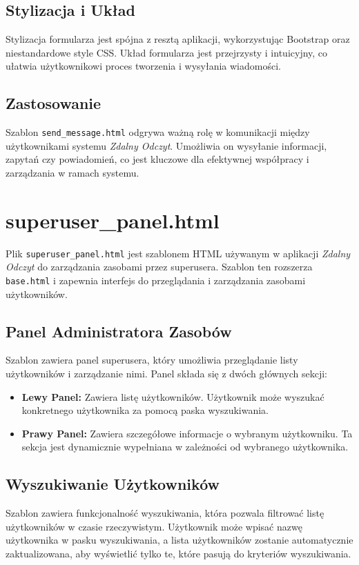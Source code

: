 \documentclass[12pt,a4paper]{report}
\begin{document}
\subsection{Stylizacja i Układ}
Stylizacja formularza jest spójna z resztą aplikacji, wykorzystując Bootstrap oraz niestandardowe style CSS. Układ formularza jest przejrzysty i intuicyjny, co ułatwia użytkownikowi proces tworzenia i wysyłania wiadomości.

\subsection{Zastosowanie}
Szablon \texttt{send\_message.html} odgrywa ważną rolę w komunikacji między użytkownikami systemu \textit{Zdalny Odczyt}. Umożliwia on wysyłanie informacji, zapytań czy powiadomień, co jest kluczowe dla efektywnej współpracy i zarządzania w ramach systemu.


\section{superuser\_panel.html}
\label{sec:superuserpanel}
Plik \texttt{superuser\_panel.html} jest szablonem HTML używanym w aplikacji \textit{Zdalny Odczyt} do zarządzania zasobami przez superusera. Szablon ten rozszerza \texttt{base.html} i zapewnia interfejs do przeglądania i zarządzania zasobami użytkowników.

\subsection{Panel Administratora Zasobów}
Szablon zawiera panel superusera, który umożliwia przeglądanie listy użytkowników i zarządzanie nimi. Panel składa się z dwóch głównych sekcji:
\begin{itemize}
\item \textbf{Lewy Panel:} Zawiera listę użytkowników. Użytkownik może wyszukać konkretnego użytkownika za pomocą paska wyszukiwania.
\item \textbf{Prawy Panel:} Zawiera szczegółowe informacje o wybranym użytkowniku. Ta sekcja jest dynamicznie wypełniana w zależności od wybranego użytkownika.
\end{itemize}

\subsection{Wyszukiwanie Użytkowników}
Szablon zawiera funkcjonalność wyszukiwania, która pozwala filtrować listę użytkowników w czasie rzeczywistym. Użytkownik może wpisać nazwę użytkownika w pasku wyszukiwania, a lista użytkowników zostanie automatycznie zaktualizowana, aby wyświetlić tylko te, które pasują do kryteriów wyszukiwania.
\end{document}
